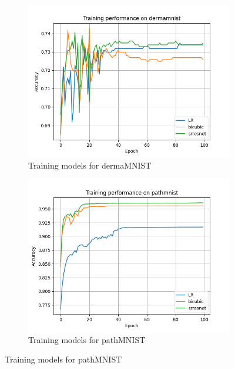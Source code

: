 \documentclass[10pt,twocolumn,letterpaper]{article}
\begin{document}
\begin{figure}
    \centering
    \begin{subfigure}{0.3\textwidth}
        \includegraphics[width=\linewidth]{Code/plots/train_dermamnist.png}
        \caption{Training models for dermaMNIST}
        \label{fig:training derma}
    \end{subfigure}
    
    \begin{subfigure}{0.3\textwidth}
        \includegraphics[width=\linewidth]{Code/plots/train_pathmnist.png}
        \caption{Training models for pathMNIST}
        \label{fig:training path}
    \end{subfigure}


\end{figure}
\end{document}
